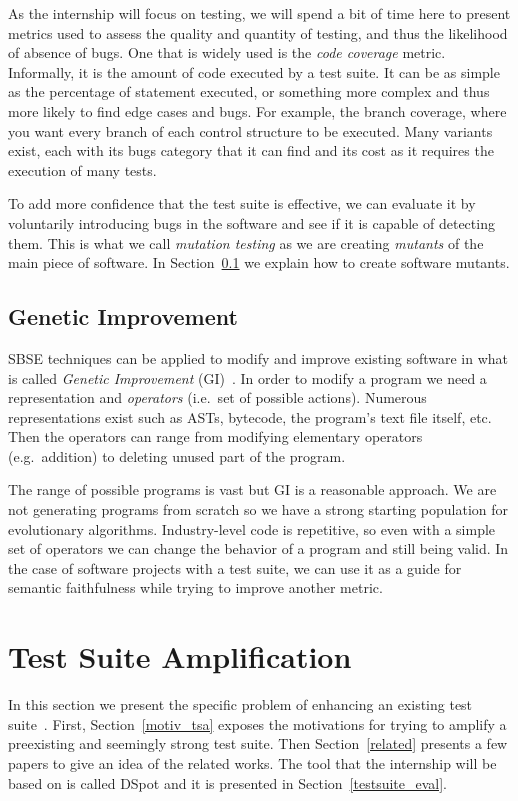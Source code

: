 \documentclass[11pt]{sdm}
\newcommand{\dspot}{DSpot\xspace}
\begin{document}
As the internship will focus on testing, we will spend a bit of time here to present metrics used to assess the quality and quantity of testing, and thus the likelihood of absence of bugs.
One that is widely used is the \textit{code coverage} metric.
Informally, it is the amount of code executed by a test suite.
It can be as simple as the percentage of statement executed, or something more complex and thus more likely to find edge cases and bugs.
For example, the branch coverage, where you want every branch of each control structure to be executed.
Many variants exist, each with its bugs category that it can find and its cost as it requires the execution of many tests.

To add more confidence that the test suite is effective, we can evaluate it by voluntarily introducing bugs in the software and see if it is capable of detecting them.
This is what we call \textit{mutation testing} as we are creating \textit{mutants} of the main piece of software.
In Section~\ref{applications} we explain how to create software mutants.

\subsection{Genetic Improvement}
\label{applications}
SBSE techniques can be applied to modify and improve existing software in what is called \textit{Genetic Improvement} (GI)~\cite{petke2017genetic}.
In order to modify a program we need a representation and \textit{operators} (i.e.\ set of possible actions).
Numerous representations exist such as ASTs, bytecode, the program's text file itself, etc.
Then the operators can range from modifying elementary operators (e.g.\ addition) to deleting unused part of the program.

The range of possible programs is vast but GI is a reasonable approach.
We are not generating programs from scratch so we have a strong starting population for evolutionary algorithms.
Industry-level code is repetitive, so even with a simple set of operators we can change the behavior of a program and still being valid.
In the case of software projects with a test suite, we can use it as a guide for semantic faithfulness while trying to improve another metric.


\section{Test Suite Amplification}
\label{tsa}
In this section we present the specific problem of enhancing an existing test suite~\cite{danglot2017emerging}.
First, Section~\ref{motiv_tsa} exposes the motivations for trying to amplify a preexisting and seemingly strong test suite.
Then Section~\ref{related} presents a few papers to give an idea of the related works.
The tool that the internship will be based on is called \dspot{} and it is presented in Section~\ref{testsuite_eval}.
\end{document}
